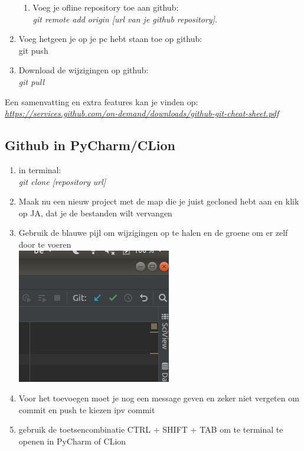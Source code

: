 \documentclass[a4paper, titlepage]{article}
\begin{document}
\begin{enumerate}
\begin{enumerate}
					\item Voeg je ofline repository toe aan github:\\ \textit{git remote add origin [url van je github repository]}.
				\end{enumerate}
				
				\item Voeg hetgeen je op je pc hebt staan toe op github:\\ git push
				
				\item Download de wijzigingen op github:\\ \textit{git pull}
			\end{enumerate}
			
			Een samenvatting en extra features kan je vinden op:\\ \href{https://services.github.com/on-demand/downloads/github-git-cheat-sheet.pdf}{\textit{https://services.github.com/on-demand/downloads/github-git-cheat-sheet.pdf}}
		
		\subsection{Github in PyCharm/CLion}
		\begin{enumerate}
			\item in terminal:\\ \textit{git clone [repository url]}
			\item Maak nu een nieuw project met de map die je juist gecloned hebt aan en klik op JA, dat je de bestanden wilt vervangen
			
			\item Gebruik de blauwe pijl om wijzigingen op te halen en de groene om er zelf door te voeren \\
			\includegraphics[scale=0.3]{img/pushpull}
			
			\item Voor het toevoegen moet je nog een message geven en zeker niet vergeten om commit en push te kiezen ipv commit
			\item gebruik de toetsencombinatie CTRL + SHIFT + TAB om te terminal te openen in PyCharm of CLion

		\end{enumerate}
		
\end{document}
